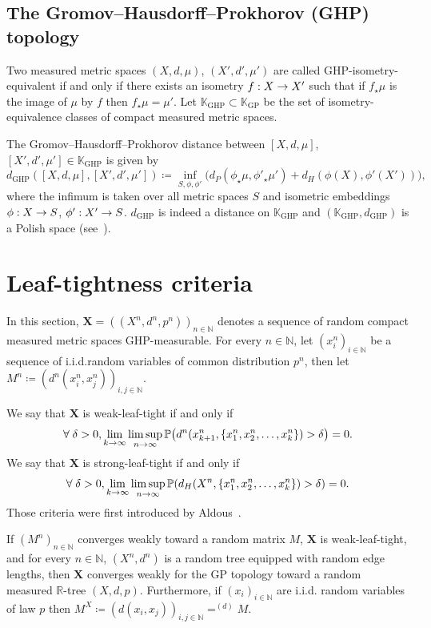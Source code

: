 \documentclass[AHL,Unicode,published]{cedram}
\newcommand{\proba}[1]{\mathbb{P}\left(#1\right)}
\DeclareMathOperator{\GP}{GP}
\DeclareMathOperator{\GHP}{GHP}
\newcommand{\K}{\mathbb{K}}
\newcommand{\N}{\mathbb{N}}
\newcommand{\R}{\mathbb{R}}
\newcommand{\1}{\mathbbm{1}}
\newcommand{\bfX}{\mathbf{X}}
\let\originalleft\left
\let\originalright\right
\renewcommand{\left}{\mathopen{}\mathclose\bgroup\originalleft}
\renewcommand{\right}{\aftergroup\egroup\originalright}
\renewcommand*{\to}{\mathchoice{\longrightarrow}{\rightarrow}{\rightarrow}{\rightarrow}}
\let\oldforall\forall
\renewcommand*{\forall}{\mathrel{\oldforall}}
\begin{document}
\subsection{The Gromov--Hausdorff--Prokhorov (GHP) topology}

Two measured metric spaces $(X,d,\mu)$, $(X',d',\mu')$ are called GHP-isometry-equiva\-lent if and only if there exists an isometry $f:X\to X'$ such that if $f_\star \mu$ is the image of $\mu$ by $f$ then $f_\star \mu=\mu'$. Let $\K_{\GHP}\subset\K_{\GP}$ be the set of isometry-equivalence classes of compact measured metric spaces.

The Gromov--Hausdorff--Prokhorov distance between $[X,d,\mu]$,$[X',d',\mu']\in \K_{\GHP}$ is given by
\[
d_{\GHP}([X,d,\mu],[X',d',\mu'])\coloneqq\inf_{S,\phi,\phi'} 
\bigl(d_P(\phi_\star \mu, \phi'_\star\mu')+d_H(\phi(X), \phi'(X')) \bigr),
\]
where the infimum is taken over all metric spaces $S$ and isometric embeddings $\phi :X\to S$, $\phi' :X'\to S$. $d_{\GHP}$ is indeed a distance on $\K_{\GHP}$ and $(\K_{\GHP},d_{\GHP})$ is a Polish space (see~\cite{ADH13}).
\section{Leaf-tightness criteria}\label{sec:leaf}
In this section, $\bfX=((X^n,d^n,p^n))_{n\in \N}$ denotes a sequence of random compact measured metric spaces GHP-measurable. For every $n\in \N$, let $(x_i^n)_{i\in \N}$ be a sequence of i.i.d.\@ random variables of common distribution $p^n$, then let $M^n\coloneqq(d^n(x_i^n,x_j^n))_{i,j\in \N}$.

We say that $\bfX$ is weak-leaf-tight if and only if
\begin{equation}\label{eq:weak-leaf-tight}
\forall \delta>0, \lim_{k\to \infty} \limsup_{n\to \infty} \proba{d^n(x^{n}_{k+1},\{x^n_1,x^n_2,\dots,x^n_k\})>\delta} = 0. 
\end{equation}
We say that $\bfX$ is strong-leaf-tight if and only if
\begin{equation}\label{eq:strong-leaf-tight}
\forall \delta>0, \lim_{k\to \infty} \limsup_{n\to \infty} \proba{d_H(X^n,\{x^n_1,x^n_2,\dots,x^n_k\})>\delta } = 0. 
\end{equation}
Those criteria were first introduced by Aldous~\cite{Ald91,Ald93}.

\begin{prop}\label{B.1}
If $(M^n)_{n\in \N}$ converges weakly toward a random matrix $M$, $\bfX$ is weak-leaf-tight, and for every $n\in \N$, $(X^n,d^n)$ is a random tree equipped with random edge lengths, then $\bfX$ converges weakly for the GP topology toward a random measured $\R$-tree $(X,d,p)$. Furthermore, if $(x_i)_{i\in \N}$ are i.i.d. random variables of law $p$ then $M^X\coloneqq(d(x_i,x_j))_{i,j\in \N}=^{(d)} M$.
\end{prop}
\end{document}
